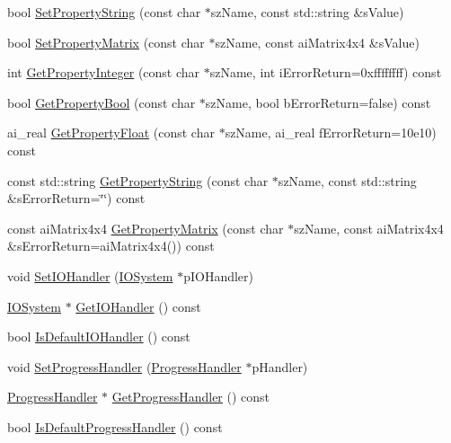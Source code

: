 \begin{CompactItemize}
bool \hyperlink{class_assimp_1_1_importer_854087b213981108e3e464cf4d293fed}{SetPropertyString} (const char $\ast$szName, const std::string \&sValue)
\item 
bool \hyperlink{class_assimp_1_1_importer_cd128e5fb5777ef238b8bd1454a9c3ad}{SetPropertyMatrix} (const char $\ast$szName, const aiMatrix4x4 \&sValue)
\item 
int \hyperlink{class_assimp_1_1_importer_3e796a0758a9f10f13107f44c542ad41}{GetPropertyInteger} (const char $\ast$szName, int iErrorReturn=0xffffffff) const 
\item 
bool \hyperlink{class_assimp_1_1_importer_90f5d35d25e5d2a0ef8bc0c6545b2010}{GetPropertyBool} (const char $\ast$szName, bool bErrorReturn=false) const 
\item 
ai\_\-real \hyperlink{class_assimp_1_1_importer_dfe1387ccc837fd59bf620e8216637fa}{GetPropertyFloat} (const char $\ast$szName, ai\_\-real fErrorReturn=10e10) const 
\item 
const std::string \hyperlink{class_assimp_1_1_importer_a31cc1aa8f83056fe097b149354ddfd3}{GetPropertyString} (const char $\ast$szName, const std::string \&sErrorReturn=\char`\"{}\char`\"{}) const 
\item 
const aiMatrix4x4 \hyperlink{class_assimp_1_1_importer_1b2e36eab7155233846b24ec30e7e273}{GetPropertyMatrix} (const char $\ast$szName, const aiMatrix4x4 \&sErrorReturn=aiMatrix4x4()) const 
\item 
void \hyperlink{class_assimp_1_1_importer_1161f46318af18bb86dfe0fc3edea4df}{SetIOHandler} (\hyperlink{class_assimp_1_1_i_o_system}{IOSystem} $\ast$pIOHandler)
\item 
\hyperlink{class_assimp_1_1_i_o_system}{IOSystem} $\ast$ \hyperlink{class_assimp_1_1_importer_be3af30f4c5eae2e875b0f32068be44d}{GetIOHandler} () const 
\item 
bool \hyperlink{class_assimp_1_1_importer_e3f26466cf7756594216ffedbc247563}{IsDefaultIOHandler} () const 
\item 
void \hyperlink{class_assimp_1_1_importer_6a4d830ffb3f77a3c7c919e0af006920}{SetProgressHandler} (\hyperlink{class_assimp_1_1_progress_handler}{ProgressHandler} $\ast$pHandler)
\item 
\hyperlink{class_assimp_1_1_progress_handler}{ProgressHandler} $\ast$ \hyperlink{class_assimp_1_1_importer_1fa669f0edc504fdf9178e8e22c728ad}{GetProgressHandler} () const 
\item 
bool \hyperlink{class_assimp_1_1_importer_2d60d970eddf8f9d35b6e9b54214cedd}{IsDefaultProgressHandler} () const 
\item 

\end{CompactItemize}
